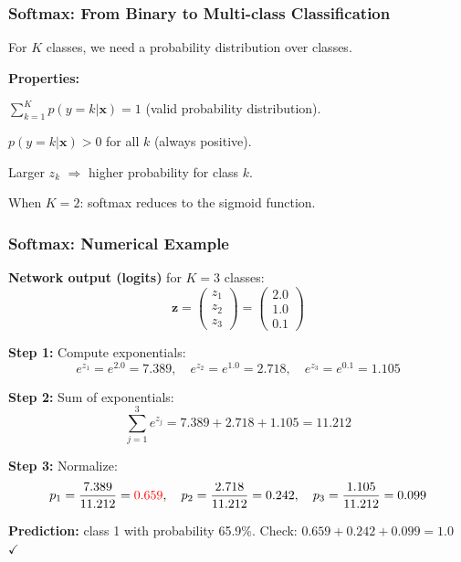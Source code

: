 \documentclass[notes,11pt, aspectratio=169]{beamer}
\newenvironment{wideitemize}{\itemize\addtolength{\itemsep}{10pt}}{\enditemize}
\newcommand{\vx}{\mathbf{x}}
\newcommand{\vz}{\mathbf{z}}
\begin{document}
\begin{frame}
\frametitle{Softmax: From Binary to Multi-class Classification}

For $K$ classes, we need a probability distribution over classes.


\vspace{6pt}
\textbf{Properties:}
\begin{wideitemize}
    \item $\sum_{k=1}^{K} p(y = k | \vx) = 1$ \quad (valid probability distribution).
    \item $p(y = k | \vx) > 0$ for all $k$ \quad (always positive).
    \item Larger $z_k$ $\Rightarrow$ higher probability for class $k$.
    \item When $K = 2$: softmax reduces to the sigmoid function.
\end{wideitemize}
\end{frame}

\begin{frame}
\frametitle{Softmax: Numerical Example}

\textbf{Network output (logits)} for $K = 3$ classes:
\[
    \vz = \begin{pmatrix} z_1 \\ z_2 \\ z_3 \end{pmatrix} = \begin{pmatrix} 2.0 \\ 1.0 \\ 0.1 \end{pmatrix}
\]

\textbf{Step 1:} Compute exponentials:
\[
    e^{z_1} = e^{2.0} = 7.389, \quad e^{z_2} = e^{1.0} = 2.718, \quad e^{z_3} = e^{0.1} = 1.105
\]

\textbf{Step 2:} Sum of exponentials:
\[
    \sum_{j=1}^{3} e^{z_j} = 7.389 + 2.718 + 1.105 = 11.212
\]

\textbf{Step 3:} Normalize:
\[
    p_1 = \frac{7.389}{11.212} = \textcolor{red}{0.659}, \quad p_2 = \frac{2.718}{11.212} = 0.242, \quad p_3 = \frac{1.105}{11.212} = 0.099
\]

\vspace{4pt}
\textbf{Prediction:} class 1 with probability 65.9\%. \quad Check: $0.659 + 0.242 + 0.099 = 1.0$ \; $\checkmark$
\end{frame}
\end{document}
